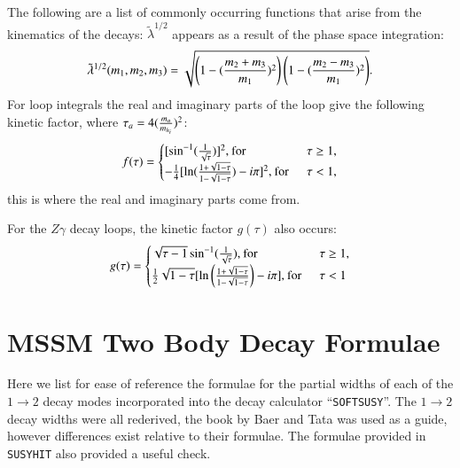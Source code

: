 \documentclass[final,3p,times]{elsarticle}
\begin{document}
The following are a list of commonly occurring functions that arise from the kinematics of the decays:
$\tilde{\lambda}^{1/2}$ appears as a result of the phase space integration:
\begin{equation}
\tilde{\lambda}^{1/2} (m_{1}, m_2, m_{3}) = \sqrt{\left(1- ({m_2 + m_3 \over m_1})^2\right)\left(1-({m_2 - m_3 \over m_1})^2\right)}.
\end{equation}
For loop integrals the real and imaginary parts of the loop give the following kinetic factor, where $\tau_{a} = 4({m_{a} \over m_{h_i}})^2$:
\begin{equation} \label{ftau}
f(\tau) = \begin{cases}
			[\sin^{-1} ({1 \over \sqrt{\tau}})]^2, \: $for$ & \: \: \tau \geq 1, \\
			-{1 \over 4} [\ln({1+\sqrt{1-\tau} \over 1-\sqrt{1-\tau}}) - i \pi]^2, \: $for$ & \: \: \tau < 1, \\
			\end{cases}
\end{equation}
this is where the real and imaginary parts come from.

For the $Z\gamma$ decay loops, the kinetic factor $g(\tau)$ also occurs:
\begin{equation}
g(\tau) = \begin{cases} \label{gtau}
			\sqrt{\tau - 1} \sin^{-1} ({1 \over \sqrt{\tau}}), \: $for$ & \: \: \tau \geq 1, \\
			{1 \over 2}\sqrt{1-\tau} [\ln\left({1+\sqrt{1-\tau} \over 1-\sqrt{1-\tau}}\right) - i \pi], \: $for$ & \: \: \tau < 1 \\
			\end{cases}
\end{equation}


\section{MSSM Two Body Decay Formulae} \label{appendix:MSSM2body}

Here we list for ease of reference the formulae for the partial widths of each of the $1 \rightarrow 2$ decay modes
incorporated into the decay calculator “{\tt {\tt SOFTSUSY}}”. The $1 \rightarrow 2$ decay widths were all rederived, the book by Baer and Tata \cite{TataBaer} was used as a guide, however differences exist relative to their formulae. The formulae provided in {\tt SUSYHIT} \cite{Djouadi:2006bz,Djouadi:1997yw,Djouadi:2005} also provided a useful check.
\end{document}
